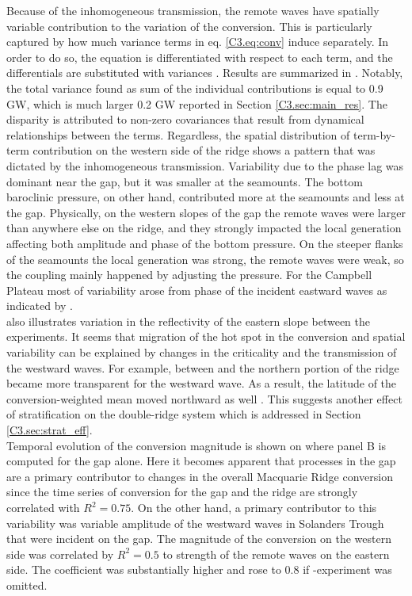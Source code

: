 \documentclass[12pt]{article}
\begin{document}
Because of the inhomogeneous transmission, the remote waves have spatially variable contribution to 
the variation of the conversion. This is particularly captured by how much variance terms in 
eq. 
\eqref{C3.eq:conv} induce separately. In order to do so, the equation is 
differentiated with respect to each term, and the differentials are substituted with variances 
\citep{kerry2014impact}. Results are summarized in . Notably, the total 
variance found as sum of the individual contributions is equal to 0.9 GW, which is much larger 
0.2 GW reported in Section \ref{C3.sec:main_res}. The disparity is attributed to non-zero 
covariances that result from dynamical relationships between the terms. Regardless, the 
spatial distribution of term-by-term contribution on the western side of the ridge  
shows a pattern that was dictated by the inhomogeneous transmission. Variability due to 
the 
phase lag was dominant near the gap, but it was smaller at the 
seamounts. The bottom baroclinic pressure, on other hand, contributed more at the 
seamounts and less at the gap. Physically, on the western slopes of the gap the remote waves were 
larger than anywhere 
else 
on the ridge, and they strongly impacted the local generation affecting both amplitude and phase of 
the 
bottom pressure. On the steeper flanks of the seamounts the local generation was strong, 
the remote waves were weak, so the coupling mainly happened by adjusting the pressure. For the 
Campbell Plateau most of variability arose from phase of the incident 
eastward waves as indicated by .\\

 also illustrates variation in the reflectivity of the eastern slope between 
the experiments. It seems that migration of the hot spot in the conversion and spatial variability 
 can be explained by changes in the criticality and the transmission 
of the westward waves. For example, between  and  the northern portion of 
the ridge became more transparent for the westward wave. As a result, the latitude of the 
conversion-weighted mean moved northward as well . This suggests another 
effect of stratification on the double-ridge system which is addressed in Section 
\ref{C3.sec:strat_eff}.\\

Temporal evolution of the conversion magnitude is shown on  
where panel B is computed for the gap alone. Here it becomes apparent that processes in the gap are 
a primary contributor to changes in the overall Macquarie Ridge conversion since the time series of 
conversion for the gap and the ridge are strongly correlated with $R^2 = 0.75$. On the other hand, 
a primary contributor to this variability was variable amplitude of the westward waves in 
Solanders Trough that were incident on the gap. The magnitude of the conversion on the western side 
was correlated by $R^2 = 0.5$ to strength of the remote waves on the eastern side. The coefficient 
was substantially higher and rose to $0.8$ if -experiment was omitted.\\
\end{document}
